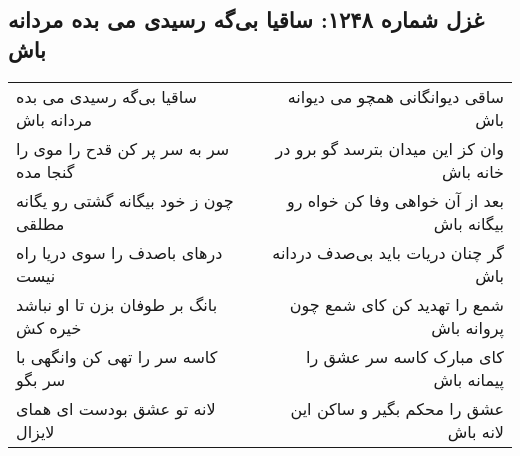 \begin{center}
\section*{غزل شماره ۱۲۴۸: ساقیا بی‌گه رسیدی می بده مردانه باش}
\label{sec:1248}
\begin{longtable}{l p{0.5cm} r}
ساقیا بی‌گه رسیدی می بده مردانه باش
&&
ساقی دیوانگانی همچو می دیوانه باش
\\
سر به سر پر کن قدح را موی را گنجا مده
&&
وان کز این میدان بترسد گو برو در خانه باش
\\
چون ز خود بیگانه گشتی رو یگانه مطلقی
&&
بعد از آن خواهی وفا کن خواه رو بیگانه باش
\\
درهای باصدف را سوی دریا راه نیست
&&
گر چنان دریات باید بی‌صدف دردانه باش
\\
بانگ بر طوفان بزن تا او نباشد خیره کش
&&
شمع را تهدید کن کای شمع چون پروانه باش
\\
کاسه سر را تهی کن وانگهی با سر بگو
&&
کای مبارک کاسه سر عشق را پیمانه باش
\\
لانه تو عشق بودست ای همای لایزال
&&
عشق را محکم بگیر و ساکن این لانه باش
\\
\end{longtable}
\end{center}
